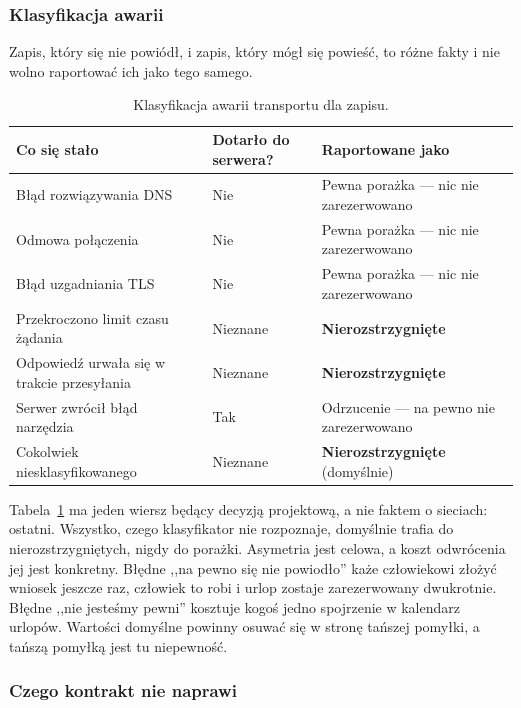 \documentclass[11pt,a4paper]{article}
\begin{document}
\subsubsection*{Klasyfikacja awarii}

Zapis, który się nie powiódł, i zapis, który mógł się powieść, to różne fakty i nie wolno raportować ich jako tego samego.

\begin{table}[htbp]
\centering
\caption{Klasyfikacja awarii transportu dla zapisu.}
\label{tab:transport}
\begin{tabularx}{\linewidth}{X l X}
\toprule
\textbf{Co się stało} & \textbf{Dotarło do serwera?} & \textbf{Raportowane jako} \\
\midrule
Błąd rozwiązywania DNS & Nie & Pewna porażka --- nic nie zarezerwowano \\
Odmowa połączenia & Nie & Pewna porażka --- nic nie zarezerwowano \\
Błąd uzgadniania TLS & Nie & Pewna porażka --- nic nie zarezerwowano \\
Przekroczono limit czasu żądania & Nieznane & \textcolor{accentorange}{\textbf{Nierozstrzygnięte}} \\
Odpowiedź urwała się w trakcie przesyłania & Nieznane & \textcolor{accentorange}{\textbf{Nierozstrzygnięte}} \\
Serwer zwrócił błąd narzędzia & Tak & Odrzucenie --- na pewno nie zarezerwowano \\
Cokolwiek niesklasyfikowanego & Nieznane & \textcolor{accentorange}{\textbf{Nierozstrzygnięte}} (domyślnie) \\
\bottomrule
\end{tabularx}
\end{table}

Tabela~\ref{tab:transport} ma jeden wiersz będący decyzją projektową, a nie faktem o sieciach: ostatni. Wszystko, czego klasyfikator nie rozpoznaje, domyślnie trafia do nierozstrzygniętych, nigdy do porażki. Asymetria jest celowa, a koszt odwrócenia jej jest konkretny. Błędne ,,na pewno się nie powiodło'' każe człowiekowi złożyć wniosek jeszcze raz, człowiek to robi i urlop zostaje zarezerwowany dwukrotnie. Błędne ,,nie jesteśmy pewni'' kosztuje kogoś jedno spojrzenie w kalendarz urlopów. Wartości domyślne powinny osuwać się w stronę tańszej pomyłki, a tańszą pomyłką jest tu niepewność.

\subsubsection*{Czego kontrakt nie naprawi}
\end{document}
